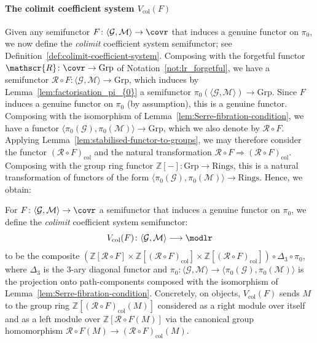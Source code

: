 \documentclass[AHL,Unicode,published]{cedram}
\newcommand{\Rings}{\ensuremath{\mathrm{Rings}}}
\newcommand{\groups}{\ensuremath{\mathrm{Grp}}}
\newcommand{\col}{\mathrm{col}}
\newcommand{\sR}{\mathscr{R}}
\newcommand{\cG}{\mathcal{G}}
\newcommand{\cM}{\mathcal{M}}
\newcommand{\bZ}{\mathbb{Z}}
\newcommand{\too}{\ensuremath{\longrightarrow}}
\begin{document}
\paragraph*{The colimit coefficient system $V_{\col}(F)$}
Given any semifunctor $F \colon \langle \cG, \cM \rangle \to \covr$ that induces a genuine functor on $\pi_{0}$, we now define the \emph{colimit} coefficient system semifunctor; see Definition~\ref{def:colimit-coefficient-system}. Composing with the forgetful functor $\sR \colon \covr \linebreak\to \groups$ of Notation~\ref{not:lr_forgetful}, we have a semifunctor $\sR \circ F \colon \langle \cG, \cM \rangle \to \groups$, which induces by Lemma~\ref{lem:factorisation_pi_{0}} a semifunctor $\pi_{0}(\langle \cG, \cM \rangle) \to \groups$. Since $F$ induces a genuine functor on $\pi_{0}$ (by assumption), this is a genuine functor. Composing with the isomorphism of Lemma~\ref{lem:Serre-fibration-condition}, we have a functor $\langle \pi_{0}(\cG), \pi_{0}(\cM) \rangle \to \groups$, which we also denote by $\sR \circ F$. Applying Lemma~\ref{lem:stabilised-functor-to-groups}, we may therefore consider the functor $(\sR \circ F)_{\col}$ and the natural transformation $\sR \circ F \Rightarrow (\sR \circ F)_{\col}$. Composing with the group ring functor $\bZ[-] \colon \groups \to \Rings$, this is a natural transformation of functors of the form $\langle \pi_{0}(\cG), \pi_{0}(\cM) \rangle \to \Rings$. Hence, we obtain:

\begin{defi}\label{def:colimit-coefficient-system}
For $F \colon \langle \cG, \cM \rangle \to \covr$ a semifunctor that induces a genuine functor on $\pi_{0}$, we define the \emph{colimit} coefficient system semifunctor:
\begin{equation}\label{eq:colim_coefficient_system}
V_{\col}(F) \colon \langle \cG,\cM \rangle \too \modlr
\end{equation}
to be the composite $(\bZ[\sR \circ F] \times \bZ[(\sR \circ F)_{\col}] \times \bZ[(\sR \circ F)_{\col}]) \circ \Delta_{3} \circ \pi_{0}$, where $\Delta_{3}$ is the $3$-ary diagonal functor and $\pi_{0} \colon \langle \cG, \cM \rangle \to \langle \pi_{0}(\cG), \pi_{0}(\cM) \rangle$ is the projection onto path-components composed with the isomorphism of Lemma~\ref{lem:Serre-fibration-condition}. Concretely, on objects, $V_{\col}(F)$ sends $M$ to the group ring $\bZ[(\sR \circ F)_{\col}(M)]$ considered as a right module over itself and as a left module over $\bZ[\sR \circ F(M)]$ via the canonical group homomorphism $\sR \circ F(M) \to (\sR \circ F)_{\col}(M)$.
\end{defi}
\end{document}

